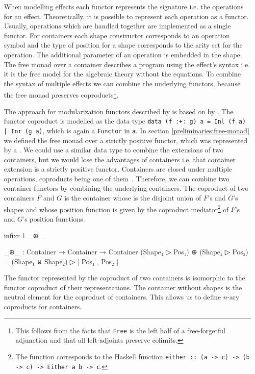 When modelling effects each functor represents the signature i.e. the operations for
an effect.
Theoretically, it is possible to represent each operation as a functor.
Usually, operations which are handled together are implemented as a single functor.
For containers each shape constructor corresponds to an operation symbol and the
type of position for a shape corresponds to the arity set for the operation.
The additional parameter of an operation is embedded in the shape.
The free monad over a container describes a program using the effect's syntax
i.e. it is the free model for the algebraic theory without the equations.
To combine the syntax of multiple effects we can combine the underlying
functors, because the free monad preserves coproducts\footnote{This follows from
the facts that \texttt{Free} is the left half of a free-forgetful adjunction and
that all left-adjoints preserve colimits.}.

The approach for modularization functors described by
\textcite{DBLP:conf/haskell/WuSH14} is based on
 by
\textcite{DBLP:journals/jfp/Swierstra08}.
The functor coproduct is modelled as the data type \texttt{data (f
:+: g) a = Inl (f a) | Inr (g a)}, which is again a \texttt{Functor} in
\texttt{a}.
In section \ref{preliminaries:free-monad} we defined the free monad over
a strictly positive functor, which was represented by a
.
We could use a similar data type to combine the extensions of two containers,
but we would lose the advantages of containers i.e. that container extension is
a strictly positive functor.
Containers are closed under multiple operations, coproducts being one of
them~\cite{DBLP:conf/fossacs/AbbottAG03}.
Therefore, we can combine two container functors by combining the underlying
containers.
The coproduct of two containers $F$ and $G$ is the container whose
 is the disjoint union of $F$'s and $G$'s shapes and whose
position function  is given by the coproduct
mediator\footnote{The function \AgdaFunction{[\_,\_]} corresponds to the Haskell
function \texttt{either :: (a -> c) -> (b -> c) -> Either a b ->
c}.} of $F$'s and $G$'s position functions.

\begin{code}[hide]
infixr 1 _⊕_
\end{code}
\begin{code}
_⊕_ : Container → Container → Container
(Shape₁ ▷ Pos₁) ⊕ (Shape₂ ▷ Pos₂) = (Shape₁ ⊎ Shape₂) ▷ [ Pos₁ , Pos₂ ]
\end{code}
The functor represented by the coproduct of two containers is isomorphic to the
functor coproduct of their representations.
The container without shapes is the neutral element for the coproduct of
containers.
This allows us to define $n$-ary coproducts for containers.

